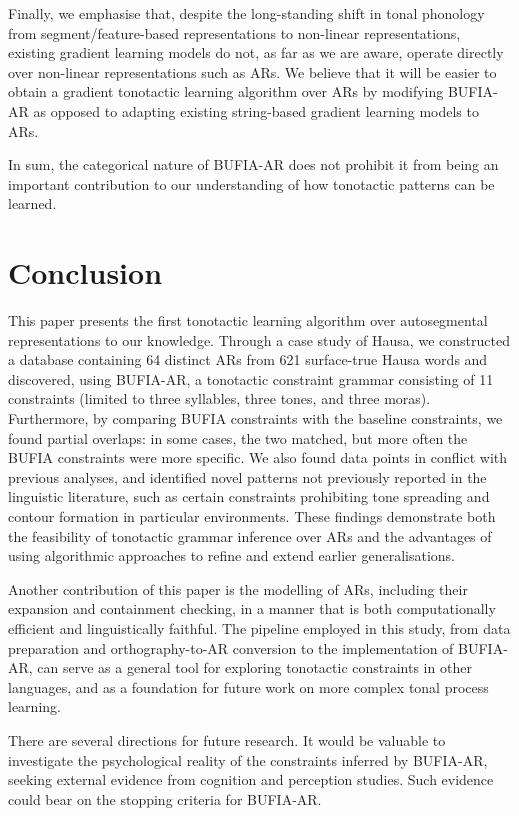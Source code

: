 \documentclass{CUP-JNL-PHO}%
\theoremstyle{definition}
\numberwithin{equation}{section}
\theoremstyle{definition}
\begin{document}
Finally, we emphasise that, despite the long-standing
shift in tonal phonology from segment/feature-based representations to
non-linear representations, existing gradient learning models do not,
as far as we are aware, operate directly over non-linear
representations such as ARs. We believe that it will be easier to
obtain a gradient tonotactic learning algorithm over ARs by modifying
BUFIA-AR as opposed to adapting existing string-based gradient
learning models to ARs.

In sum, the categorical nature of BUFIA-AR does not prohibit it from
being an important contribution to our understanding of how tonotactic
patterns can be learned.

\section{Conclusion}
\label{sec:conclusion}
This paper presents the first tonotactic learning algorithm over
autosegmental representations to our knowledge. Through a case study
of Hausa, we constructed a database containing 64 distinct ARs from
621 surface-true Hausa words and discovered, using BUFIA-AR, a
tonotactic constraint grammar consisting of 11 constraints (limited to
three syllables, three tones, and three moras). Furthermore, by
comparing BUFIA constraints with the baseline constraints, we found
partial overlaps: in some cases, the two matched, but more often the
BUFIA constraints were more specific. We also found data points in
conflict with previous analyses, and identified novel patterns not
previously reported in the linguistic literature, such as certain
constraints prohibiting tone spreading and contour formation in
particular environments. These findings demonstrate both the
feasibility of tonotactic grammar inference over ARs and the
advantages of using algorithmic approaches to refine and extend
earlier generalisations.

Another contribution of this paper is the modelling of ARs, including
their expansion and containment checking, in a manner that is both
computationally efficient and linguistically faithful. The pipeline 
employed in this study, from data preparation and orthography-to-AR 
conversion to the implementation of BUFIA-AR, can serve as a general 
tool for exploring tonotactic constraints in other languages, and as 
a foundation for future work on more complex tonal process learning.

There are several directions for future research. It would be valuable
to investigate the psychological reality of the constraints inferred
by BUFIA-AR, seeking external evidence from cognition and perception
studies. Such evidence could bear on the stopping criteria for
BUFIA-AR.
\end{document}
